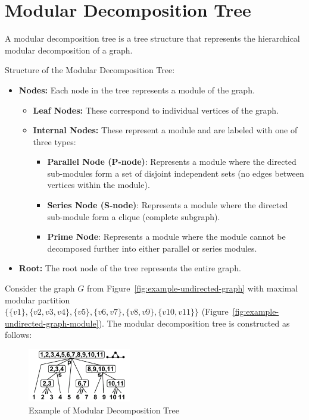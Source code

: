 \section{Modular Decomposition Tree}\label{sec:modular-decomposition-tree}

A modular decomposition tree is a tree structure that represents the hierarchical modular decomposition of a graph.

Structure of the Modular Decomposition Tree:
\begin{itemize}
    \item \textbf{Nodes:} Each node in the tree represents a module of the graph.
            \begin{itemize}
                \item \textbf{Leaf Nodes:} These correspond to individual vertices of the graph.
                \item \textbf{Internal Nodes:} These represent a module and are labeled with one of three types:
                        \begin{itemize}
                            \item \textbf{Parallel Node (P-node)}: Represents a module where the directed sub-modules form a set of disjoint independent sets (no edges between vertices within the module).
                            \item \textbf{Series Node (S-node)}: Represents a module where the directed sub-module form a clique (complete subgraph).
                            \item \textbf{Prime Node}: Represents a module where the module cannot be decomposed further into either parallel or series modules.
                        \end{itemize}
            \end{itemize}
    \item \textbf{Root:} The root node of the tree represents the entire graph.
\end{itemize}


\begin{myex}
    Consider the graph $G$ from Figure~\ref{fig:example-undirected-graph} with maximal modular partition \\ $\{\{v1\}, \{v2, v3, v4\}, \{v5\}, \{v6, v7\}, \{v8, v9\}, \{v10, v11\}\}$ (Figure~\ref{fig:example-undirected-graph-module}).
    The modular decomposition tree is constructed as follows:

    \begin{figure}[!h]
        \centering
        \includegraphics[width=0.40\textwidth]{images/graphs/undirected_graph_wikipedia_modular_decomposition}
        \caption{Example of Modular Decomposition Tree}
        \label{fig:example-undirected-graph-modular-decomposition-tree}
    \end{figure}
\end{myex}


